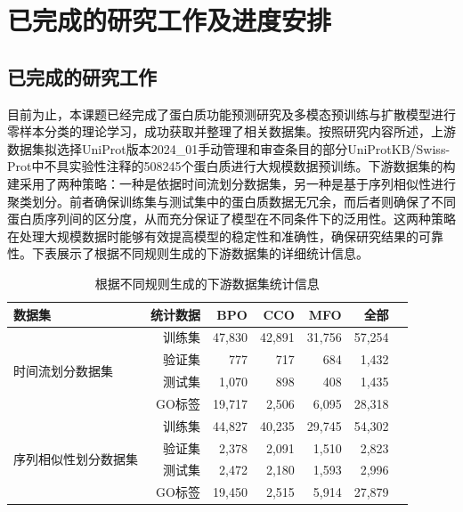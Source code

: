 
\chapter{已完成的研究工作及进度安排}

\section{已完成的研究工作}
目前为止，本课题已经完成了蛋白质功能预测研究及多模态预训练与扩散模型进行零样本分类的理论学习，成功获取并整理了相关数据集。按照研究内容所述，上游数据集拟选择UniProt版本2024\_01手动管理和审查条目的部分UniProtKB/Swiss-Prot中不具实验性注释的508245个蛋白质进行大规模数据预训练。下游数据集的构建采用了两种策略：一种是依据时间流划分数据集，另一种是基于序列相似性进行聚类划分。前者确保训练集与测试集中的蛋白质数据无冗余，而后者则确保了不同蛋白质序列间的区分度，从而充分保证了模型在不同条件下的泛用性。这两种策略在处理大规模数据时能够有效提高模型的稳定性和准确性，确保研究结果的可靠性。下表展示了根据不同规则生成的下游数据集的详细统计信息。

\begin{table}[h!]
\centering
\caption{根据不同规则生成的下游数据集统计信息}
\begin{tabular}{@{}lrrrrrr@{}}  %
\toprule
数据集 & 统计数据 & BPO & CCO & MFO & 全部 \\
\midrule
\multirow{4}{*}{时间流划分数据集} 
 & 训练集 & 47,830 & 42,891 & 31,756 & 57,254 \\
 & 验证集 & 777 & 717 & 684 & 1,432 \\
 & 测试集 & 1,070 & 898 & 408 & 1,435 \\
 & GO标签 & 19,717 & 2,506 & 6,095 & 28,318 \\
\multirow{4}{*}{序列相似性划分数据集} 
 & 训练集 & 44,827 & 40,235 & 29,745 & 54,302 \\
 & 验证集 & 2,378 & 2,091 & 1,510 & 2,823 \\
 & 测试集 & 2,472 & 2,180 & 1,593 & 2,996 \\
 & GO标签 & 19,450 & 2,515 & 5,914 & 27,879 \\
\bottomrule
\end{tabular}
\end{table}

